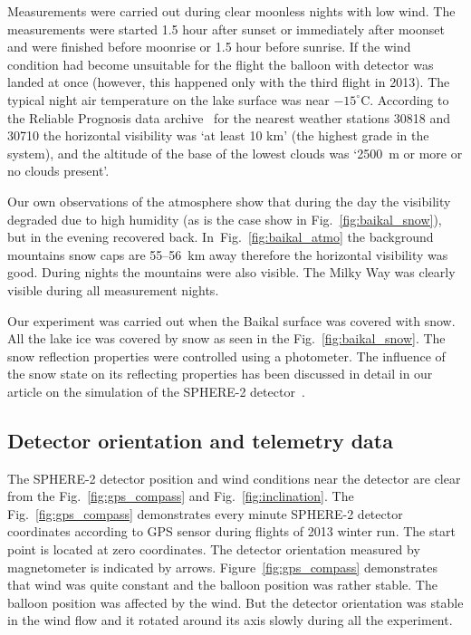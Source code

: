 \documentclass[final,5p,times,twocolumn]{elsarticle}
\begin{document}
Measurements were carried out during clear moonless nights with low wind. The measurements were started 1.5 hour after sunset or immediately after moonset and were finished before moonrise or 1.5 hour before sunrise. If the wind condition had become unsuitable for the flight the balloon with detector was landed at once (however, this happened only with the third flight in 2013). The typical night air temperature on the lake surface was near $-15^\circ$C. According to the Reliable Prognosis data archive~\cite{rp5} for the nearest weather stations 30818 and 30710 the horizontal visibility was `at least 10 km' (the highest grade in the system), and the altitude of the base of the lowest clouds was `2500~m or more or no clouds present'. 

Our own observations of the atmosphere show that during the day the visibility degraded due to high humidity (as is the case show in Fig.~\ref{fig:baikal_snow}), but in the evening recovered back. In~Fig.~\ref{fig:baikal_atmo} the background mountains snow caps are 55--56~km away therefore the horizontal visibility was good. During nights the mountains were also visible. The Milky Way was clearly visible during all measurement nights. 

Our experiment was carried out when the Baikal surface was covered with snow. All the lake ice was covered by snow as seen in the Fig.~\ref{fig:baikal_snow}. The snow reflection properties were controlled using a photometer. The influence of the snow state on its reflecting properties has been discussed in detail in our article on the simulation of the SPHERE-2 detector~\cite{Ant19}.


\subsection{Detector orientation and telemetry data\label{sect:telemetrydata}}

The \mbox{SPHERE-2} detector position and wind conditions near the detector are clear from the Fig.~\ref{fig:gps_compass} and Fig.~\ref{fig:inclination}. The Fig.~\ref{fig:gps_compass} demonstrates every minute \mbox{SPHERE-2} detector coordinates according to GPS sensor during flights of 2013 winter run. The start point is located at zero coordinates. The detector orientation measured by magnetometer is indicated by arrows. Figure~\ref{fig:gps_compass} demonstrates that wind was quite constant and the balloon position was rather stable. The balloon position was affected by the wind. But the detector orientation was stable in the wind flow and it rotated around its axis slowly during all the experiment.  
\end{document}
